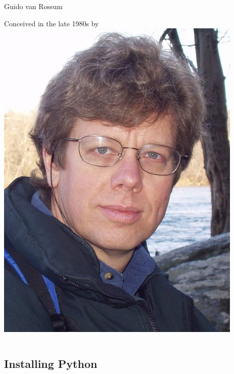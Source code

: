 \documentclass[colorlinks]{beamer}
\begin{document}
\begin{frame}[fragile]
\begin{columns}[T]
\begin{column}{.3\textwidth}
        \begin{block}{ \centering  Guido van Rossum}
            \begin{center}
                Conceived in the late 1980s by 
                \includegraphics[scale=0.2]{figs/Guido_van_Rossum.jpg}
            \end{center}
        \end{block}
    \end{column}
  \end{columns}
\end{frame}


\subsection{Installing Python}
\end{document}
